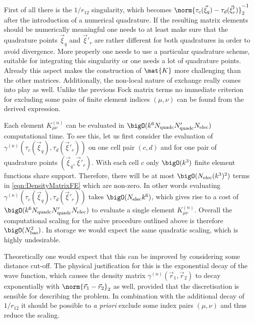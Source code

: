 First of all there is the $1/r_{12}$ singularity,
which becomes $\norm{\tau_c(\vec{\xi}_q) - \tau_d(\vec{\xi}'_r)}_2^{-1}$
after the introduction of a numerical quadrature.
If the resulting matrix elements should be numerically meaningful
one needs to at least make sure that the quadrature
points $\vec{\xi}_q$ and $\vec{\xi}'_r$ are rather different for both
quadratures in order to avoid divergence.
More properly one needs to use a particular quadrature scheme,
suitable for integrating this singularity
or one needs a lot of quadrature points.
Already this aspect makes the construction of $\mat{K}$ more challenging
than the other matrices.
Additionally, the non-local nature of \HF exchange really comes
into play as well.
Unlike the previous Fock matrix terms
no immediate criterion for excluding some
pairs of finite element indices $(\mu, \nu)$ can be found
from the derived expression.

Each element $K^{(n)}_{\mu\nu}$
can be evaluated in $\bigO(k^6 \Nquadc \Nquadc' \Nelec)$
computational time.
To see this, let us first consider the evaluation of
$\gamma^{(n)}\!\left(\tau_c(\vec{\xi}_q), \tau_d(\vec{\xi}'_r)\right)$
on one cell pair $(c,d)$ and for one pair
of quadrature points $(\vec{\xi}_q, \vec{\xi}'_r)$.
With each cell $c$ only $\bigO(k^3)$ finite element functions share support.
Therefore,
there will be at most $\bigO(\Nelec (k^3)^2)$
terms in \eqref{eqn:DensityMatrixFE} which are non-zero.
In other words evaluating
$\gamma^{(n)}\!\left(\tau_c(\vec{\xi}_q), \tau_d(\vec{\xi}'_r)\right)$
takes $\bigO(\Nelec k^6)$,
which gives rise to a cost of $\bigO(k^6 \Nquadc \Nquadc' \Nelec)$
to evaluate a single element $K^{(n)}_{\mu\nu}$.
Overall the computational scaling for the na\"{i}ve
procedure outlined above is therefore $\bigO(\Nbas^2)$.
In storage we would expect the same quadratic scaling,
which is highly undesirable.

Theoretically one would expect
that this can be improved by considering some distance cut-off.
The physical justification for this is the exponential decay of the wave function,
which causes the density matrix $\gamma^{(n)}(\vec{r}_1, \vec{r}_2)$
to decay exponentially with $\norm{\vec{r}_1 - \vec{r}_2}_2$
as well,
provided that the discretisation is sensible for describing the problem.
In combination with the additional decay of $1/r_{12}$
it should be possible to \textit{a priori} exclude some index pairs $(\mu, \nu)$
and thus reduce the scaling.

